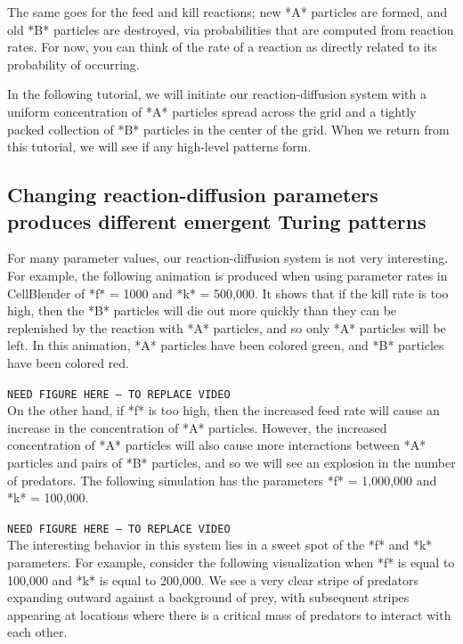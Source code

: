 {\begin{qbox}\end{qbox}

The same goes for the feed and kill reactions; new *A* particles are formed, and old *B* particles are destroyed, via probabilities that are computed from reaction rates. For now, you can think of the rate of a reaction as directly related to its probability of occurring.

In the following tutorial, we will initiate our reaction-diffusion system with a uniform concentration of *A* particles spread across the grid and a tightly packed collection of *B* particles in the center of the grid. When we return from this tutorial, we will see if any high-level patterns form.


\FloatBarrier
{}
\subsection{Changing reaction-diffusion parameters produces different emergent Turing patterns}

For many parameter values, our reaction-diffusion system is not very interesting.  For example, the following animation is produced when using parameter rates in CellBlender of *f* = 1000 and *k* = 500,000.  It shows that if the kill rate is too high, then the *B* particles will die out more quickly than they can be replenished by the reaction with *A* particles, and so only *A* particles will be left. In this animation, *A* particles have been colored green, and *B* particles have been colored red.

\texttt{NEED FIGURE HERE -- TO REPLACE VIDEO}\\

On the other hand, if *f* is too high, then the increased feed rate will cause an increase in the concentration of *A* particles. However, the increased concentration of *A* particles will also cause more interactions between *A* particles and pairs of *B* particles, and so we will see an explosion in the number of predators. The following simulation has the parameters *f* = 1,000,000 and *k* = 100,000.

\texttt{NEED FIGURE HERE -- TO REPLACE VIDEO}\\

The interesting behavior in this system lies in a sweet spot of the *f* and *k* parameters. For example, consider the following visualization when *f* is equal to 100,000 and *k* is equal to 200,000. We see a very clear stripe of predators expanding outward against a background of prey, with subsequent stripes appearing at locations where there is a critical mass of predators to interact with each other.

}
